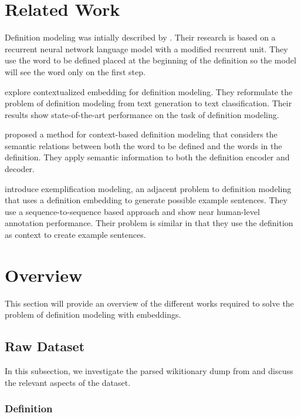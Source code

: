 \documentclass[11pt,a4paper]{article}
\begin{document}
\section{Related Work}

Definition modeling was intially described by \citet{noraset_definition_2016}.
Their research is based on a recurrent neural network language model
\cite{mikolov_recurrent_2010} with a modified recurrent unit. They use the word
to be defined placed at the beginning of the definition so the model will see
the word only on the first step.

\citet{chang_what_2019} explore contextualized embedding for definition
modeling. They reformulate the problem of definition modeling from text
generation to text classification. Their results show state-of-the-art
performance on the task of definition modeling.

\citet{washio_bridging_2019} proposed a method for context-based definition
modeling that considers the semantic relations between both the word to be
defined and the words in the definition. They apply semantic information to both
the definition encoder and decoder.

\citet{barba_exemplification_2021} introduce exemplification modeling, an
adjacent problem to definition modeling that uses a definition embedding to
generate possible example sentences. They use a sequence-to-sequence based
approach and show near human-level annotation performance. Their problem is
similar in that they use the definition as context to create example sentences.

\section{Overview}

This section will provide an overview of the different works required to solve
the problem of definition modeling with embeddings.

\subsection{Raw Dataset}
In this subsection, we investigate the parsed wikitionary dump from
\citet{wu_computational_2020} and discuss the relevant aspects of the dataset.

\subsubsection{Definition}
\end{document}
